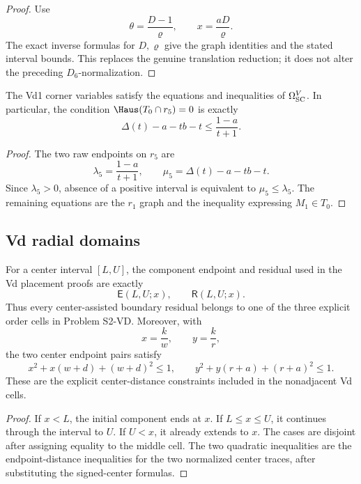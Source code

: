\begin{proof}
Use
\[
 \theta=\frac{D-1}{\varrho},
 \qquad
 x=\frac{aD}{\varrho}.
\]
The exact inverse formulas for \(D,\varrho\) give the graph identities and
the stated interval bounds.  This replaces the genuine translation reduction;
it does not alter the preceding \(D_6\)-normalization.
\end{proof}

\begin{proposition}
\label{prop:s2-sc-vd1-bridge}
The Vd1 corner variables satisfy the equations and inequalities of
\(\Omega_{\rm SC}^{V}\).  In particular, the condition
\(\Haus(T_0\cap r_5)=0\) is exactly
\[
 \Delta(t)-a-tb-t\le\frac{1-a}{t+1}.
\]
\end{proposition}

\begin{proof}
The two raw endpoints on $r_5$ are
\[
 \lambda_5=\frac{1-a}{t+1},
 \qquad
 \mu_5=\Delta(t)-a-tb-t.
\]
Since \(\lambda_5>0\), absence of a positive interval is equivalent to
\(\mu_5\le\lambda_5\).  The remaining equations are the $r_1$ graph and
the inequality expressing $M_1\in T_0$.
\end{proof}

\subsection{Vd radial domains}

\begin{proposition}
\label{prop:s2-vd-residual-bridge}
For a center interval \([L,U]\), the component endpoint and residual used in
the Vd placement proofs are exactly
\[
 \mathsf E(L,U;x),\qquad \mathsf R(L,U;x).
\]
Thus every center-assisted boundary residual belongs to one of the three
explicit order cells in Problem S2-VD.  Moreover, with
\[
 x=\frac{k}{w},\qquad y=\frac{k}{r},
\]
the two center endpoint pairs satisfy
\[
 x^2+x(w+d)+(w+d)^2\le1,\qquad
 y^2+y(r+a)+(r+a)^2\le1.
\]
These are the explicit center-distance constraints included in the
nonadjacent Vd cells.
\end{proposition}

\begin{proof}
If \(x<L\), the initial component ends at \(x\).  If \(L\le x\le U\), it
continues through the interval to \(U\).  If \(U<x\), it already extends to
\(x\).  The cases are disjoint after assigning equality to the middle cell.  The two
quadratic inequalities are the endpoint-distance inequalities for the two
normalized center traces, after substituting the signed-center formulas.
\end{proof}

